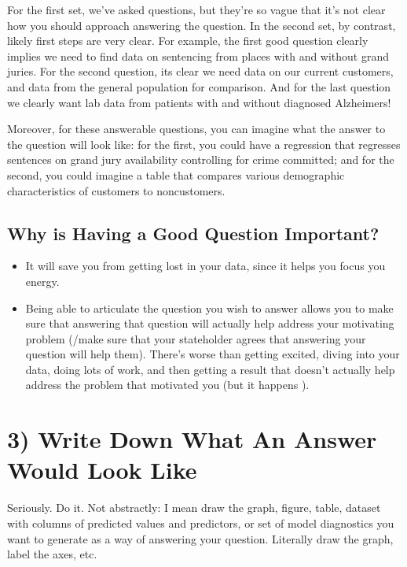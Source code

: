 \documentclass[letterpaper,10pt,english]{jupyterBook}
\begin{document}
\sphinxAtStartPar
For the first set, we’ve asked questions, but they’re so vague that it’s not clear how you should approach answering the question. In the second set, by contrast, likely first steps are very clear. For example, the first good question clearly implies we need to find data on sentencing from places with and without grand juries. For the second question, its clear we need data on our current customers, and data from the general population for comparison. And for the last question we clearly want lab data from patients with and without diagnosed Alzheimers!

\sphinxAtStartPar
Moreover, for these answerable questions, you can imagine what the answer to the question will look like: for the first, you could have a regression that regresses sentences on grand jury availability controlling for crime committed; and for the second, you could imagine a table that compares various demographic characteristics of customers to non\sphinxhyphen{}customers.


\subsection{Why is Having a Good Question Important?}
\label{\detokenize{40_in_practice/00_backwards_design:why-is-having-a-good-question-important}}\begin{itemize}
\item {} 
\sphinxAtStartPar
It will save you from getting lost in your data, since it helps you focus you energy.

\item {} 
\sphinxAtStartPar
Being able to articulate the question you wish to answer allows you to make sure that answering that question will actually help address your motivating problem (/make sure that your stateholder agrees that answering your question will help them). There’s  worse than getting excited, diving into your data, doing lots of work, and then getting a result that doesn’t actually help address the problem that motivated you (but it happens ).

\end{itemize}


\section{3) Write Down What An Answer Would Look Like}
\label{\detokenize{40_in_practice/00_backwards_design:write-down-what-an-answer-would-look-like}}
\sphinxAtStartPar
Seriously. Do it. Not abstractly: I mean draw the graph, figure, table, dataset with columns of predicted values and predictors, or set of model diagnostics you want to generate as a way of answering your question. Literally draw the graph, label the axes, etc.
\end{document}
